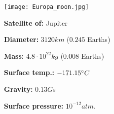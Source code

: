 \begin{tcolorbox}[colback=red!5,colframe=DarkRed!40!black,title=Europa \cite{Europa}]

{\centering
\texttt{[image: Europa\_moon.jpg]}
\par}

\textbf{Satellite of:} Jupiter

\textbf{Diameter:} $3120 km$ ($0.245$ Earths)

\textbf{Mass:} $4.8\cdot 10^{22} kg$ ($0.008$ Earths)

\textbf{Surface temp.:} $-171.15\degree C$

\textbf{Gravity:} $0.13 G$s

\textbf{Surface pressure:} $10^{-12} atm.$
\end{tcolorbox}

